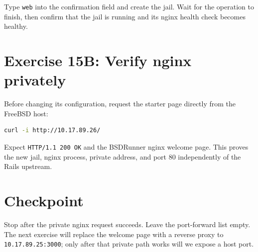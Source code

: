 Type \texttt{web} into the confirmation field and create the jail. Wait for the
operation to finish, then confirm that the jail is running and its nginx health
check becomes healthy.

\section{Exercise 15B: Verify nginx privately}

Before changing its configuration, request the starter page directly from the
FreeBSD host:

\begin{lstlisting}[language=sh]
curl -i http://10.17.89.26/
\end{lstlisting}

Expect \texttt{HTTP/1.1 200 OK} and the BSDRunner nginx welcome page. This
proves the new jail, nginx process, private address, and port 80 independently
of the Rails upstream.

\section{Checkpoint}

Stop after the private nginx request succeeds. Leave the port-forward list
empty. The next exercise will replace the welcome page with a reverse proxy to
\texttt{10.17.89.25:3000}; only after that private path works will we expose a
host port.
